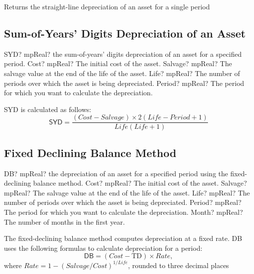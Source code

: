 \vspace{0.3cm}
Returns the straight-line depreciation of an asset for a single period


\subsection{Sum-of-Years' Digits Depreciation of an Asset}


\begin{mpFunctionsExtract}
	\mpWorksheetFunctionFourNotImplemented
	{SYD? mpReal? the sum-of-years' digits depreciation of an asset for a specified period.}
	{Cost? mpReal?  The initial cost of the asset.}
	{Salvage? mpReal? The salvage value at the end of the life of the asset.}
	{Life? mpReal? The number of periods over which the asset is being depreciated.}
	{Period? mpReal? The period for which you want to calculate the depreciation.}
\end{mpFunctionsExtract}

\vspace{0.3cm}
SYD is calculated as follows:
\begin{equation}
\textsf{SYD} = \frac{(\textit{Cost}-\textit{Salvage}) \times 2(\textit{Life}-\textit{Period}+1)}{\textit{Life}(\textit{Life}+1)}
\end{equation}




\subsection{Fixed Declining Balance Method}

\begin{mpFunctionsExtract}
	\mpWorksheetFunctionFiveNotImplemented
	{DB? mpReal? the depreciation of an asset for a specified period using the fixed-declining balance method.}
	{Cost? mpReal?  The initial cost of the asset.}
	{Salvage? mpReal? The salvage value at the end of the life of the asset.}
	{Life? mpReal? The number of periods over which the asset is being depreciated.}
	{Period? mpReal? The period for which you want to calculate the depreciation.}
	{Month? mpReal? The number of months in the first year.}
\end{mpFunctionsExtract}

\vspace{0.3cm}
The fixed-declining balance method computes depreciation at a fixed rate. DB uses the following formulas to calculate depreciation for a period:
\begin{equation}
\textsf{DB} = (Cost - \text{TD}) \times Rate,
\end{equation}
where $Rate = 1 - (Salvage / Cost)^{1 / \textit{Life}}$, rounded to three decimal places

